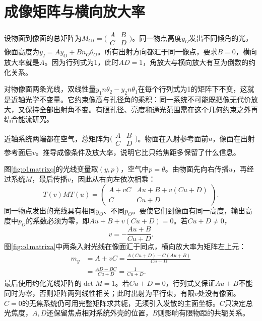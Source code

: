 \section{成像矩阵与横向放大率}
设物面到像面的总矩阵为$M_{OI}=\bigl(\begin{smallmatrix}A&B\\C&D\end{smallmatrix}\bigr)$。同一物点高度$y_O$发出不同倾角的光，像面高度为$y_I=Ay_O+B n_O\theta_O$。所有出射方向都汇于同一像点，要求$B=0$，横向放大率就是$A$。因为行列式为1，此时$AD=1$，角放大与横向放大有互为倒数的约化关系。

对物像面两条光线，双线性量$y_1n\theta_2-y_2n\theta_1$在每个行列式为1的矩阵下不变，这就是近轴光学不变量。它约束像高与孔径角的乘积：同一系统不可能既把像无代价放大，又保持全部出射角不变。有限孔径、亮度和通光范围需在这个几何约束之外再结合能流研究。

\begin{example}\label{ex:o1matriximage}
近轴系统两端都在空气，总矩阵为$\bigl(\begin{smallmatrix}A&B\\C&D\end{smallmatrix}\bigr)$。物面在入射参考面前$u$，像面在出射参考面后$v$。推导成像条件及放大率，说明它比只给焦距多保留了什么信息。
\end{example}
\begin{solution}
图\ref{fig:o1matrixq}的光线变量取$(y,p)$，空气中$p=\theta$。由物面先向右传播$u$，再经过系统$M$，最后传播$v$，因此从右向左依次相乘：
\[
 T(v)MT(u)=
 \begin{pmatrix}
 A+vC&Au+B+v(Cu+D)\\ C&Cu+D
 \end{pmatrix}.
\]
同一物点发出的光线具有相同$y_O$、不同$p_O$。要使它们到像面有同一高度，输出高度中$p_O$的系数必须为零，即$Au+B+v(Cu+D)=0$。若$Cu+D\ne0$，
\[
 v=-\frac{Au+B}{Cu+D}.
\]
图\ref{fig:o1matrixa}中两条入射光线在像面汇于同点，横向放大率为矩阵左上元：
\begin{align*}
 m_y&=A+vC
 =\frac{A(Cu+D)-C(Au+B)}{Cu+D}\\
 &=\frac{AD-BC}{Cu+D}=\frac1{Cu+D}.
\end{align*}
最后使用约化光线矩阵的$\det M=1$。若$Cu+D=0$，行列式又保证$Au+B$不能同时为零，否则矩阵两列线性相关；此时出射为平行束，有限$v$处没有像面。$C=0$的无焦系统仍可用完整矩阵求共轭，无须引入发散的主面坐标。$C$只决定总光焦度，$A,D$还保留焦点相对系统外壳的位置，$B$则影响有限物距的共轭关系。
\end{solution}

